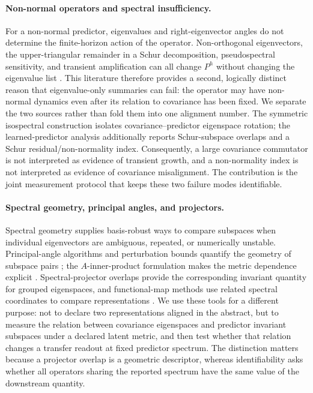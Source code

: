\documentclass{article}
\begin{document}
\paragraph{Non-normal operators and spectral insufficiency.}
For a non-normal predictor, eigenvalues and right-eigenvector angles do not determine the finite-horizon action of the operator. Non-orthogonal eigenvectors, the upper-triangular remainder in a Schur decomposition, pseudospectral sensitivity, and transient amplification can all change $P^h$ without changing the eigenvalue list \citep{bhatia1997matrix,stewart1990matrix,trefethen2005spectra}. This literature therefore provides a second, logically distinct reason that eigenvalue-only summaries can fail: the operator may have non-normal dynamics even after its relation to covariance has been fixed. We separate the two sources rather than fold them into one alignment number. The symmetric isospectral construction isolates covariance--predictor eigenspace rotation; the learned-predictor analysis additionally reports Schur-subspace overlaps and a Schur residual/non-normality index. Consequently, a large covariance commutator is not interpreted as evidence of transient growth, and a non-normality index is not interpreted as evidence of covariance misalignment. The contribution is the joint measurement protocol that keeps these two failure modes identifiable.

\paragraph{Spectral geometry, principal angles, and projectors.}
Spectral geometry supplies basis-robust ways to compare subspaces when individual eigenvectors are ambiguous, repeated, or numerically unstable. Principal-angle algorithms and perturbation bounds quantify the geometry of subspace pairs \citep{bjork1973principal,davis1970rotation,stewart1990matrix}; the $A$-inner-product formulation makes the metric dependence explicit \citep{knyazev2002principal}. Spectral-projector overlaps provide the corresponding invariant quantity for grouped eigenspaces, and functional-map methods use related spectral coordinates to compare representations \citep{fumero2024lfm,sarkar2026spectralgeometry}. We use these tools for a different purpose: not to declare two representations aligned in the abstract, but to measure the relation between covariance eigenspaces and predictor invariant subspaces under a declared latent metric, and then test whether that relation changes a transfer readout at fixed predictor spectrum. The distinction matters because a projector overlap is a geometric descriptor, whereas identifiability asks whether all operators sharing the reported spectrum have the same value of the downstream quantity.
\end{document}
